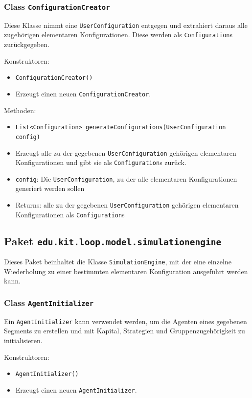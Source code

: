 \documentclass[parskip=full,11pt]{scrartcl}
\begin{document}
\subsubsection{Class \texttt{ConfigurationCreator}}
Diese Klasse nimmt eine \texttt{UserConfiguration} entgegen und extrahiert daraus alle zugehörigen elementaren Konfigurationen. Diese werden als \texttt{Configuration}s zurückgegeben.

Konstruktoren:
\begin{itemize}\itemsep -10pt
\item \texttt{ConfigurationCreator()}
\item[] Erzeugt einen neuen \texttt{ConfigurationCreator}.
\end{itemize}

Methoden:
\begin{itemize}\itemsep -10pt
\item \texttt{List<Configuration> generateConfigurations(UserConfiguration config)}
\item[] Erzeugt alle zu der gegebenen \texttt{UserConfiguration} gehörigen elementaren Konfigurationen und gibt sie als \texttt{Configuration}s zurück.
\item[] \texttt{config}: Die \texttt{UserConfiguration}, zu der alle elementaren Konfigurationen generiert werden sollen
\item[] Returns: alle zu der gegebenen \texttt{UserConfiguration} gehörigen elementaren Konfigurationen als \texttt{Configuration}s
\end{itemize}

\subsection{Paket \texttt{edu.kit.loop.model.simulationengine}}

Dieses Paket beinhaltet die Klasse \texttt{SimulationEngine}, mit der eine einzelne Wiederholung zu einer bestimmten elementaren Konfiguration ausgeführt werden kann.

\subsubsection{Class \texttt{AgentInitializer}}
Ein \texttt{AgentInitializer} kann verwendet werden, um die Agenten eines gegebenen Segments zu erstellen und mit Kapital, Strategien und Gruppenzugehörigkeit zu initialisieren.

Konstruktoren:
\begin{itemize}\itemsep -10pt
\item \texttt{AgentInitializer()}
\item[] Erzeugt einen neuen \texttt{AgentInitializer}.
\end{itemize}
\end{document}
